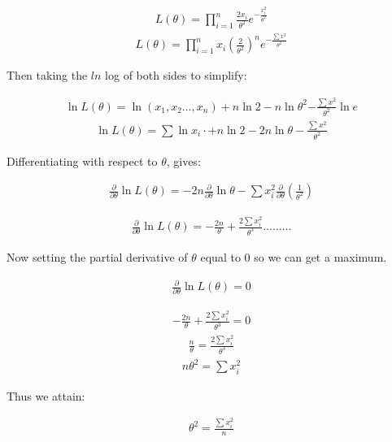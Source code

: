\documentclass{article}
\begin{document}
\begin{align}
    L(\theta) = \prod_{i=1}^n\frac{2x_{i}}{\theta^2}e^{-\frac{x_{i}^2}{\theta^2}}
\end{align}
\begin{align}
    L(\theta) = \prod_{i=1}^n x_{i}(\frac{2}{\theta^2})^n e^{-\frac{\sum{x^2}}{\theta^2}}
\end{align}

Then taking the $ln$ log of both sides to simplify:

\begin{align}
    \ln{L(\theta)}= \ln{(x_{1},x_{2}\dots,x_{n})} + n\ln{2} - n\ln\theta^2 {-\frac{\sum{x^2}}{\theta^2}}\ln{e}
\end{align}
\begin{align}
    \ln{L(\theta)}= \sum\ln{x_{i}} \cdot + n\ln{2} - 2n\ln{\theta} -\frac{\sum{x^2}}{\theta^2}
\end{align}

Differentiating with respect to $\theta$, gives:

\begin{align}
    \frac{\partial }{\partial \theta}\ln L{(\theta)} = -2n\frac{\partial}{\partial\theta}\ln\theta - \sum x_{i}^2\frac{\partial}{\partial\theta}(\frac{1}{\theta^2})
\end{align}

\begin{align}
    \frac{\partial }{\partial \theta}\ln L{(\theta)} = -\frac{2n}{\theta} + \frac{2\sum x_{i}^2}{\theta^3} \dots \dots \dots
\end{align}

Now setting the partial derivative of $\theta$ equal to $0$ so we can get a maximum.

\begin{align}
    \frac{\partial }{\partial \theta}\ln L{(\theta)} = 0
\end{align}

\begin{align}
    -\frac{2n}{\theta} + \frac{2\sum x_{i}^2}{\theta^3} = 0
\end{align}
\begin{align}
    \frac{n}{\theta} = \frac{2\sum x_{i}^2}{\theta^3}
\end{align}
\begin{align}
   n\theta^2= \sum x_{i}^2
\end{align}

Thus we attain:

\begin{align}
    \theta^2 = \frac{\sum x_{i}^2}{n}
\end{align}
\end{document}
